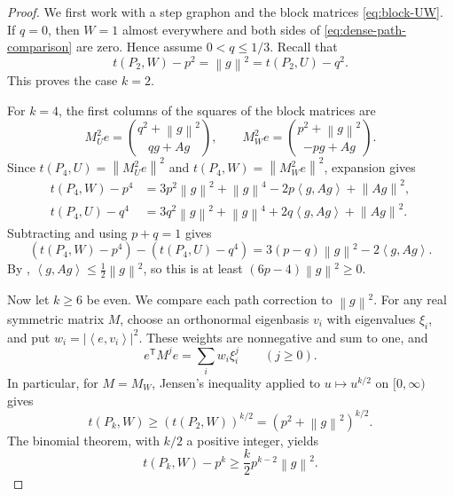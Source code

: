 \documentclass[11pt]{article}
\numberwithin{equation}{section}
\newcommand{\ip}[2]{\left\langle #1,#2\right\rangle}
\newcommand{\norm}[1]{\left\lVert #1\right\rVert}
\newcommand{\tP}[2]{t(P_{#1},#2)}
\begin{document}
\begin{proof}
  We first work with a step graphon and the block matrices
  \eqref{eq:block-UW}. If $q=0$, then $W=1$ almost everywhere and
  both sides of \eqref{eq:dense-path-comparison} are zero.
  Hence assume $0<q\le1/3$. Recall that
  \begin{equation}\label{eq:complementary-second-moments}
    \tP2W-p^2=\norm g^2=\tP2U-q^2.
  \end{equation}
  This proves the case $k=2$.

  For $k=4$, the first columns of the squares of the block
  matrices are
  \[
    M_U^2e=\binom{q^2+\norm g^2}{qg+Ag},\qquad
    M_W^2e=\binom{p^2+\norm g^2}{-pg+Ag}.
  \]
  Since $\tP4U=\norm{M_U^2e}^2$ and
  $\tP4W=\norm{M_W^2e}^2$, expansion gives
  \begin{align*}
    \tP4W-p^4
       &=3p^2\norm g^2+\norm g^4-2p\ip g{Ag}+\norm{Ag}^2,\\
    \tP4U-q^4
       &=3q^2\norm g^2+\norm g^4+2q\ip g{Ag}+\norm{Ag}^2.
  \end{align*}
  Subtracting and using $p+q=1$ gives
  \begin{equation}\label{eq:four-path-difference}
    (\tP4W-p^4)-(\tP4U-q^4)
       =3(p-q)\norm g^2-2\ip g{Ag}.
  \end{equation}
  By ,
  $\ip g{Ag}\le\tfrac12\norm g^2$, so this is at least
  $(6p-4)\norm g^2\ge0$.

  Now let $k\ge6$ be even. We compare each path correction to
  $\norm g^2$. For any real symmetric matrix $M$, choose an
  orthonormal eigenbasis $v_i$ with eigenvalues $\xi_i$, and put
  $w_i=|\ip e{v_i}|^2$. These weights are nonnegative and sum
  to one, and
  \[
    e^{\mathsf T}M^je=\sum_i w_i\xi_i^j
       \qquad(j\ge0).
  \]
  In particular, for $M=M_W$, Jensen's inequality applied to
  $u\mapsto u^{k/2}$ on $[0,\infty)$ gives
  \[
    \tP kW\ge(\tP2W)^{k/2}
       =(p^2+\norm g^2)^{k/2}.
  \]
  The binomial theorem, with $k/2$ a positive integer, yields
  \begin{equation}\label{eq:even-path-lower}
    \tP kW-p^k\ge\frac k2p^{k-2}\norm g^2.
  \end{equation}


\end{proof}
\end{document}

